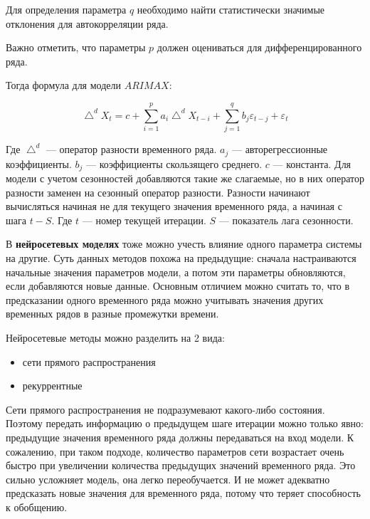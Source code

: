 Для определения параметра $ q $ необходимо найти статистически значимые отклонения
для автокорреляции ряда.

Важно отметить, что параметры $ p $ должен оцениваться для дифференцированного ряда.

Тогда формула для модели $ ARIMAX $:

\begin{equation}
	\bigtriangleup^{d} X_t = c + \sum_{i=1}^{p}{ a_i\bigtriangleup^{d}X_{t-i} } + \sum_{j=1}^{q}{ b_{j} \varepsilon_{t-j} + \varepsilon_t }
\end{equation}

\noindent Где $ \bigtriangleup^{d} $ --- оператор разности временного ряда. $ a_{j} $ --- авторегрессионные
коэффициенты.  $ b_{j} $ --- коэффициенты скользящего среднего. $ c $ --- константа.
Для модели с учетом сезонностей добавляются такие же слагаемые, но в них
оператор разности заменен на сезонный оператор разности.
Разности начинают вычисляться начиная не для текущего значения временного ряда,
а начиная с шага $ t - S $. Где $ t $ --- номер текущей итерации. $ S $ --- показатель лага сезонности.

В \textbf{нейросетевых моделях} тоже можно учесть влияние одного параметра системы на другие.
Суть данных методов похожа на предыдущие: сначала настраиваются начальные
значения параметров модели, а потом эти параметры обновляются, если добавляются новые данные.
Основным отличием можно считать то, что в предсказании одного временного ряда можно
учитывать значения других временных рядов в разные промежутки времени.

Нейросетевые методы можно разделить на 2 вида:
\begin{itemize}
	\item сети прямого распространения \cite{svozil1997introduction}
	\item рекуррентные \cite{zaremba2014recurrent}
\end{itemize}

Сети прямого распространения не подразумевают какого-либо состояния.
Поэтому передать информацию о предыдущем шаге итерации можно только явно:
предыдущие значения временного ряда должны передаваться на вход модели.
К сожалению, при таком подходе, количество параметров сети возрастает очень быстро
при увеличении количества предыдущих значений временного ряда. Это сильно усложняет модель,
она легко переобучается. И не может адекватно предсказать новые значения для временного ряда,
потому что теряет способность к обобщению.

